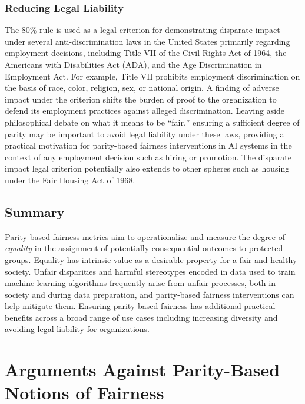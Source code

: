 \documentclass[11pt,dvipdfm]{article}
\begin{document}
\subsubsection{Reducing Legal Liability}
The 80\% rule \cite{eeoc1966guidelines} is used as a legal criterion for demonstrating disparate impact under several anti-discrimination laws in the United States primarily regarding employment decisions, including Title VII of the Civil Rights Act of 1964, the Americans with Disabilities Act (ADA), and the Age Discrimination in Employment Act.  For example, Title VII prohibits employment discrimination on the basis of race, color, religion, sex, or national origin.  A finding of adverse impact under the criterion shifts the burden of proof to the organization to defend its employment practices against alleged discrimination.  %
Leaving aside philosophical debate on what it means to be ``fair,'' ensuring a sufficient degree of parity may be important to avoid legal liability under these laws, providing a practical motivation for parity-based fairness interventions in AI systems in the context of any employment decision such as hiring or promotion. The disparate impact legal criterion potentially also extends to other spheres such as housing under the Fair Housing Act of 1968. 

\subsection{Summary} Parity-based fairness metrics aim to operationalize and measure the degree of \emph{equality} in the assignment of potentially consequential outcomes to protected groups.  Equality has intrinsic value as a desirable property for a fair and healthy society.  Unfair disparities and harmful stereotypes encoded in data used to train machine learning algorithms frequently arise from unfair processes, both in society and during data preparation, and parity-based fairness interventions can help mitigate them.  Ensuring parity-based fairness has additional practical benefits across a broad range of use cases including increasing diversity and avoiding legal liability for organizations. 

\section{Arguments Against Parity-Based Notions of Fairness}
\label{sec:againstParity}
\end{document}
